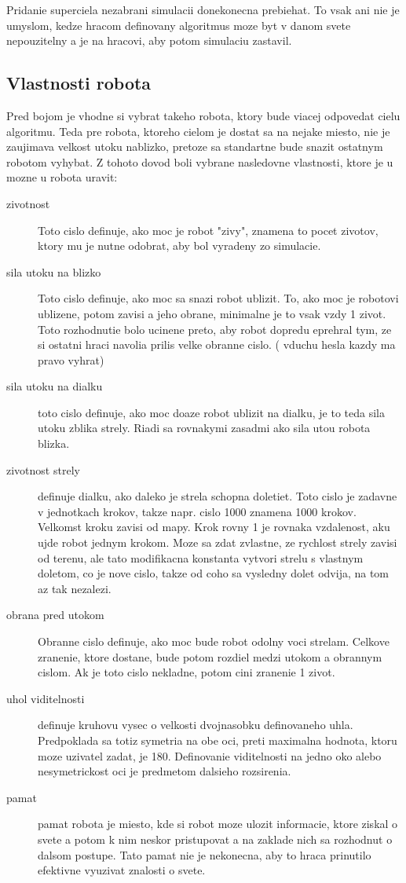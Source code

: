 \documentclass[a4paper,11pt,final]{report}
\begin{document}
Pridanie superciela nezabrani simulacii donekonecna prebiehat. To vsak ani nie je umyslom, kedze hracom definovany algoritmus moze byt v danom svete nepouzitelny a je na hracovi, aby potom simulaciu zastavil.
\subsection{Vlastnosti robota}
Pred bojom je vhodne si vybrat takeho robota, ktory bude viacej odpovedat cielu algoritmu. Teda pre robota, ktoreho cielom je dostat sa na nejake miesto, nie je zaujimava velkost utoku nablizko, pretoze sa standartne bude snazit ostatnym robotom vyhybat. Z tohoto dovod boli vybrane nasledovne vlastnosti, ktore je u mozne u robota uravit:
\begin{description}
\item[zivotnost]
Toto cislo definuje, ako moc je robot "zivy", znamena to pocet zivotov, ktory mu je nutne odobrat, aby bol vyradeny zo simulacie.
\item [sila utoku na blizko]
Toto cislo definuje, ako moc sa snazi robot ublizit. To, ako moc je robotovi ublizene, potom zavisi a jeho obrane, minimalne je to vsak vzdy 1 zivot. Toto rozhodnutie bolo ucinene preto, aby robot dopredu eprehral tym, ze si ostatni hraci navolia prilis velke obranne cislo. ( vduchu hesla kazdy ma pravo vyhrat)
\item [sila utoku na dialku]
toto cislo definuje, ako moc doaze robot ublizit na dialku, je to teda sila utoku zblika strely. Riadi sa rovnakymi zasadmi ako sila utou robota blizka.
\item [zivotnost strely]
definuje dialku, ako daleko je strela schopna doletiet. Toto cislo je zadavne v jednotkach krokov, takze napr. cislo 1000 znamena 1000 krokov. Velkomst kroku zavisi od mapy. Krok rovny 1 je rovnaka vzdalenost, aku ujde robot jednym krokom. Moze sa zdat zvlastne, ze rychlost strely zavisi od terenu, ale tato modifikacna konstanta vytvori strelu s vlastnym doletom, co je nove cislo, takze od coho sa vysledny dolet odvija, na tom az tak nezalezi.
\item [obrana pred utokom]
Obranne cislo definuje, ako moc bude robot odolny voci strelam. Celkove zranenie, ktore dostane, bude potom rozdiel medzi utokom a obrannym cislom. Ak je toto cislo nekladne, potom cini zranenie 1 zivot.
\item [uhol viditelnosti]
definuje kruhovu vysec o velkosti dvojnasobku definovaneho uhla. Predpoklada sa totiz symetria na obe oci, preti maximalna hodnota, ktoru moze uzivatel zadat, je 180. Definovanie viditelnosti na jedno oko alebo nesymetrickost oci je predmetom dalsieho rozsirenia.%
\item [pamat]
pamat robota je miesto, kde si robot moze ulozit informacie, ktore ziskal o svete a potom k nim neskor pristupovat a na zaklade nich sa rozhodnut o dalsom postupe. Tato pamat nie je nekonecna, aby to hraca prinutilo efektivne vyuzivat znalosti o svete.
\end{description}
\end{document}
